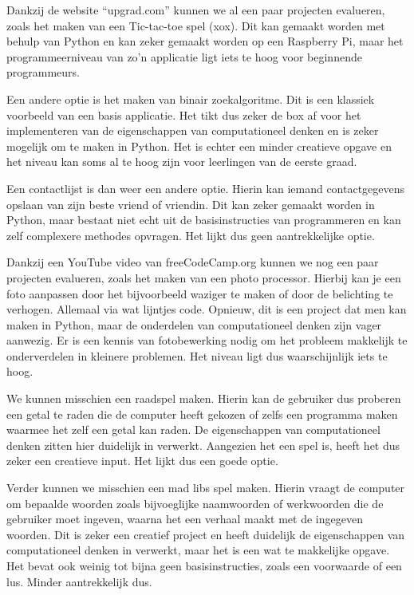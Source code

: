 Dankzij de website “upgrad.com” kunnen we al een paar projecten evalueren, zoals het maken van een Tic-tac-toe spel (xox). Dit kan gemaakt worden met behulp van Python en kan zeker gemaakt worden op een Raspberry Pi, maar het programmeerniveau van zo’n applicatie ligt iets te hoog voor beginnende programmeurs. 

Een andere optie is het maken van binair zoekalgoritme. Dit is een klassiek voorbeeld van een basis applicatie. Het tikt dus zeker de box af voor het implementeren van de eigenschappen van computationeel denken en is zeker mogelijk om te maken in Python. Het is echter een minder creatieve opgave en het niveau kan soms al te hoog zijn voor leerlingen van de eerste graad.

Een contactlijst is dan weer een andere optie. Hierin kan iemand contactgegevens opslaan van zijn beste vriend of vriendin. Dit kan zeker gemaakt worden in Python, maar bestaat niet echt uit de basisinstructies van programmeren en kan zelf complexere methodes opvragen. Het lijkt dus geen aantrekkelijke optie.

Dankzij een YouTube video van freeCodeCamp.org kunnen we nog een paar projecten evalueren, zoals het maken van een photo processor. Hierbij kan je een foto aanpassen door het bijvoorbeeld waziger te maken of door de belichting te verhogen. Allemaal via wat lijntjes code. Opnieuw, dit is een project dat men kan maken in Python, maar de onderdelen van computationeel denken zijn vager aanwezig. Er is een kennis van fotobewerking nodig om het probleem makkelijk te onderverdelen in kleinere problemen. Het niveau ligt dus waarschijnlijk iets te hoog.

We kunnen misschien een raadspel maken. Hierin kan de gebruiker dus proberen een getal te raden die de computer heeft gekozen of zelfs een programma maken waarmee het zelf een getal kan raden. De eigenschappen van computationeel denken zitten hier duidelijk in verwerkt. Aangezien het een spel is, heeft het dus zeker een creatieve input. Het lijkt dus een goede optie.

Verder kunnen we misschien een mad libs spel maken. Hierin vraagt de computer om bepaalde woorden zoals bijvoeglijke naamwoorden of werkwoorden die de gebruiker moet ingeven, waarna het een verhaal maakt met de ingegeven woorden. Dit is zeker een creatief project en heeft duidelijk de eigenschappen van computationeel denken in verwerkt, maar het is een wat te makkelijke opgave. Het bevat ook weinig tot bijna geen basisinstructies, zoals een voorwaarde of een lus. Minder aantrekkelijk dus.

